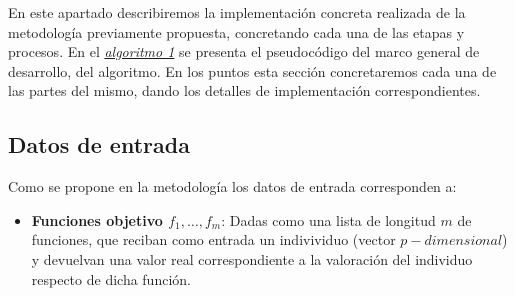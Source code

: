 

\justify


En este apartado describiremos la implementación concreta realizada de la metodología previamente propuesta, concretando cada una de las etapas y procesos. En el \hyperref[alg:1]{\textit{algoritmo 1}} se presenta el pseudocódigo del marco general de desarrollo, del algoritmo. En los puntos esta sección concretaremos cada una de las partes del mismo, dando los detalles de implementación correspondientes.\\

\subsection{Datos de entrada}

Como se propone en la metodología los datos de entrada corresponden a:\\

\begin{itemize}
    \item \textbf{Funciones objetivo $f_1, \dots, f_m$}:  Dadas como una lista de longitud $m$ de funciones, que reciban como entrada un indivividuo (vector $p-dimensional$) y devuelvan una valor real correspondiente a la valoración del individuo respecto de dicha función.\\
\end{itemize}

